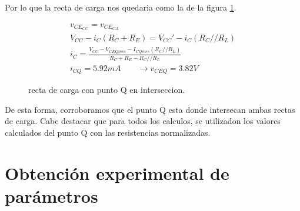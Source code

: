 \documentclass[chaptersright]{informeutn}
\begin{document}
    Por lo que la recta de carga nos quedaria como la de la figura \ref{fig:recta_carga}.
    \begin{figure}[!ht]
      \centering
      \begin{minipage}{0.45\textwidth}
      \end{minipage}
      \begin{minipage}{0.54\textwidth}
        \begin{gather*}
          v_{CE_{CC}} = v_{CE_{CA}}\\[6pt]
          V_{CC} - i_C (R_C + R_E) = V_{CC}' - i_C (R_C//R_L)\\[6pt]
          i_C = \frac{V_{CC} - V_{CEQ mes} - I_{CQ mes} (R_C//R_L)}{R_C + R_E - R_C//R_L}\\[6pt]
          i_{CQ} = 5.92mA \qquad \to v_{CEQ} = 3.82V
        \end{gather*}
      \end{minipage}
      \caption{recta de carga con punto Q en interseccion.}
      \label{fig:recta_carga}
    \end{figure}

    De esta forma, corroboramos que el punto Q esta donde intersecan ambas rectas de carga. Cabe destacar que para todos
    los calculos, se utilizadon los valores calculados del punto Q con las resistencias normalizadas.
  \section{Obtención experimental de parámetros}
\end{document}
